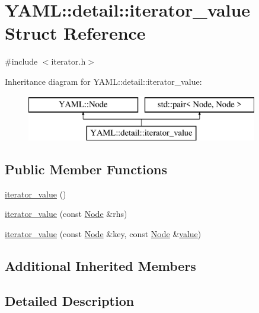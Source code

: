 \hypertarget{struct_y_a_m_l_1_1detail_1_1iterator__value}{}\section{Y\+A\+ML\+::detail\+::iterator\+\_\+value Struct Reference}
\label{struct_y_a_m_l_1_1detail_1_1iterator__value}


{\ttfamily \#include $<$iterator.\+h$>$}

Inheritance diagram for Y\+A\+ML\+::detail\+::iterator\+\_\+value\+:\begin{figure}[H]
\begin{center}
\leavevmode
\includegraphics[height=2.000000cm]{struct_y_a_m_l_1_1detail_1_1iterator__value}
\end{center}
\end{figure}
\subsection*{Public Member Functions}
\begin{DoxyCompactItemize}
\item 
\mbox{\hyperlink{struct_y_a_m_l_1_1detail_1_1iterator__value_ad2e86d3b3e4246e164a4e4ae20b9ff84}{iterator\+\_\+value}} ()
\item 
\mbox{\hyperlink{struct_y_a_m_l_1_1detail_1_1iterator__value_a5ed7408bbeb9e14a1b27dee066574468}{iterator\+\_\+value}} (const \mbox{\hyperlink{class_y_a_m_l_1_1_node}{Node}} \&rhs)
\item 
\mbox{\hyperlink{struct_y_a_m_l_1_1detail_1_1iterator__value_a2711429871915b88ce398cd19e8a65e1}{iterator\+\_\+value}} (const \mbox{\hyperlink{class_y_a_m_l_1_1_node}{Node}} \&key, const \mbox{\hyperlink{class_y_a_m_l_1_1_node}{Node}} \&\mbox{\hyperlink{glad_8h_a03aff08f73d7fde3d1a08e0abd8e84fa}{value}})
\end{DoxyCompactItemize}
\subsection*{Additional Inherited Members}


\subsection{Detailed Description}


